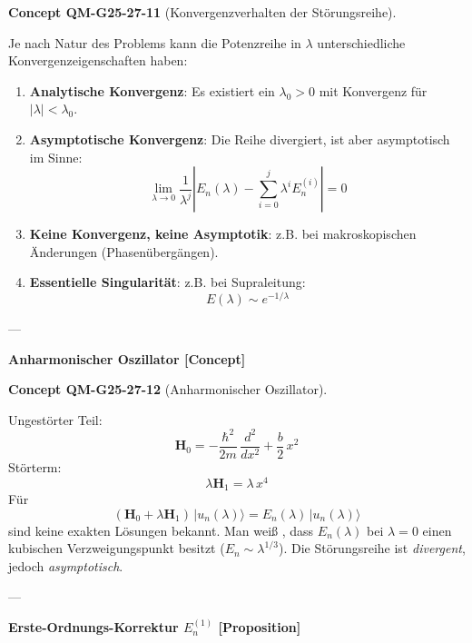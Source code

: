 \documentclass[10pt, letterpaper]{article}
\newcommand{\CustomHeading}[3]{%
  \par\medskip\noindent%
  \textbf{#1 #2} \textnormal{(#3)}.\enskip%
}
\newenvironment{CONC}[2]{\begin{unitbox}\CustomHeading{Concept}{#1}{#2}}{\end{unitbox}}
\begin{document}
\begin{CONC}{QM-G25-27-11}{Konvergenzverhalten der Störungsreihe}
Je nach Natur des Problems kann die Potenzreihe in $\lambda$ unterschiedliche Konvergenzeigenschaften haben:

\begin{enumerate}
  \item \textbf{Analytische Konvergenz}: Es existiert ein $\lambda_0 > 0$ mit Konvergenz für $|\lambda| < \lambda_0$.
  \item \textbf{Asymptotische Konvergenz}: Die Reihe divergiert, ist aber asymptotisch im Sinne:
  \[
  \lim_{\lambda \to 0} \frac{1}{\lambda^j} \left| E_n(\lambda) - \sum_{i=0}^j \lambda^i E_n^{(i)} \right| = 0
  \]
  \item \textbf{Keine Konvergenz, keine Asymptotik}: z.B. bei makroskopischen Änderungen (Phasenübergängen).
  \item \textbf{Essentielle Singularität}: z.B. bei Supraleitung:
  \[
  E(\lambda) \sim e^{-1/\lambda}
  \]
\end{enumerate}
\end{CONC}

---


\textbf{Anharmonischer Oszillator [Concept]}

\begin{CONC}{QM-G25-27-12}{Anharmonischer Oszillator}
Ungestörter Teil:
\[
\mathbf{H}_0 = -\frac{\hbar^{2}}{2m}\,\frac{d^{2}}{dx^{2}} + \frac{b}{2}\,x^{2}
\]
Störterm:
\[
\lambda \mathbf{H}_1 = \lambda\,x^{4}
\]
Für
\[
(\mathbf{H}_0 + \lambda \mathbf{H}_1)\,|u_n(\lambda)\rangle = E_n(\lambda)\,|u_n(\lambda)\rangle
\]
sind keine exakten Lösungen bekannt. Man weiß \cite{Simon70}, dass $E_n(\lambda)$ bei $\lambda=0$ einen kubischen Verzweigungspunkt besitzt ($E_n \sim \lambda^{1/3}$). Die Störungsreihe ist \emph{divergent}, jedoch \emph{asymptotisch}.
\end{CONC}

---

\textbf{Erste-Ordnungs-Korrektur $E_n^{(1)}$ [Proposition]}
\end{document}

